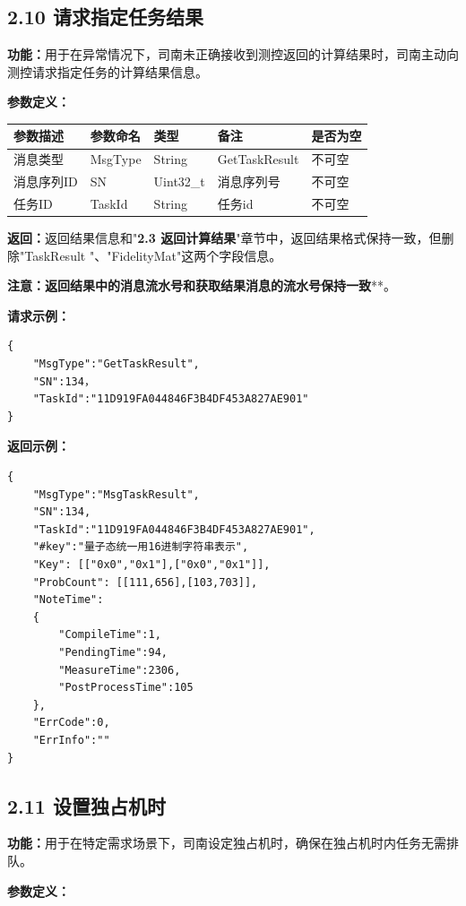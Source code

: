 \documentclass{ctexart}
\begin{document}
\subsection{2.10 请求指定任务结果}

\textbf{功能：}用于在异常情况下，司南未正确接收到测控返回的计算结果时，司南主动向测控请求指定任务的计算结果信息。

\textbf{参数定义：}

\begin{longtable}{|l|l|l|l|l|}
\hline
\textbf{\textbf{参数描述}} & \textbf{\textbf{参数命名}} & \textbf{\textbf{类型}} & \textbf{\textbf{备注}} & \textbf{\textbf{是否为空}} \\
\hline
消息类型 & MsgType & String & GetTaskResult & 不可空 \\
消息序列ID & SN & Uint32_t & 消息序列号 & 不可空 \\
任务ID & TaskId & String & 任务id & 不可空 \\
\hline
\end{longtable}

\textbf{返回：}返回结果信息和"\textbf{2.3 返回计算结果}"章节中，返回结果格式保持一致，但删除"TaskResult "、"FidelityMat"这两个字段信息。

\textbf{注意：}\textbf{返回结果中的消息流水号和获取结果消息的流水号保持一致}**。

\textbf{请求示例：}

\begin{verbatim}{
    "MsgType":"GetTaskResult",
    "SN":134，
    "TaskId":"11D919FA044846F3B4DF453A827AE901"
}\end{verbatim}
\textbf{返回示例：}
\begin{verbatim}{
    "MsgType":"MsgTaskResult",
    "SN":134,
    "TaskId":"11D919FA044846F3B4DF453A827AE901",
    "#key":"量子态统一用16进制字符串表示",
    "Key": [["0x0","0x1"],["0x0","0x1"]],
    "ProbCount": [[111,656],[103,703]],
    "NoteTime":
    {
        "CompileTime":1,
        "PendingTime":94,
        "MeasureTime":2306,
        "PostProcessTime":105
    },
    "ErrCode":0,
    "ErrInfo":""
}\end{verbatim}

\subsection{2.11 设置独占机时}

\textbf{功能：}用于在特定需求场景下，司南设定独占机时，确保在独占机时内任务无需排队。

\textbf{参数定义：}
\end{document}
